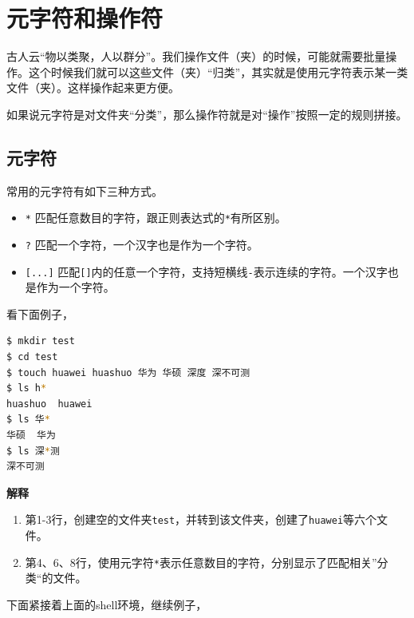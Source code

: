 \documentclass[doctor,openright,twoside]{sjtuthesis}
\providecommand{\tightlist}{%
    \setlength{\itemsep}{0pt}\setlength{\parskip}{0pt}}
\newcommand{\passthrough}[1]{#1}
\theoremstyle{plain}
\theoremstyle{definition}
\theoremstyle{remark}
\theoremstyle{ocrenumbox}
\theoremstyle{plain}
\newcommand\cqh{“}
\newcommand\cqt{”}
\begin{document}
\section{元字符和操作符}

古人云\cqh 物以类聚，人以群分\cqt 。我们操作文件（夹）的时候，可能就需要批量操作。这个时候我们就可以这些文件（夹）\cqh 归类\cqt ，其实就是使用元字符表示某一类文件（夹）。这样操作起来更方便。

如果说元字符是对文件夹\cqh 分类\cqt ，那么操作符就是对\cqh 操作\cqt 按照一定的规则拼接。

\hypertarget{filesystem:metachar}{%
\subsection{元字符}\label{filesystem:metachar}}

常用的元字符有如下三种方式。

\begin{itemize}
\tightlist
\item
  \passthrough{\lstinline!*!}
  匹配任意数目的字符，跟正则表达式的\passthrough{\lstinline!*!}有所区别。
\item
  \passthrough{\lstinline!?!} 匹配一个字符，一个汉字也是作为一个字符。
\item
  \passthrough{\lstinline![...]!}
  匹配\passthrough{\lstinline![]!}内的任意一个字符，支持短横线\passthrough{\lstinline!-!}表示连续的字符。一个汉字也是作为一个字符。
\end{itemize}

看下面例子，

\begin{lstlisting}[language=bash]
$ mkdir test
$ cd test
$ touch huawei huashuo 华为 华硕 深度 深不可测
$ ls h*
huashuo  huawei
$ ls 华*
华硕  华为
$ ls 深*测
深不可测
\end{lstlisting}

\textbf{解释}

\begin{enumerate}
\def\labelenumi{\arabic{enumi}.}
\tightlist
\item
  第1-3行，创建空的文件夹\passthrough{\lstinline!test!}，并转到该文件夹，创建了\passthrough{\lstinline!huawei!}等六个文件。
\item
  第4、6、8行，使用元字符\passthrough{\lstinline!*!}表示任意数目的字符，分别显示了匹配相关''分类``的文件。
\end{enumerate}

下面紧接着上面的shell环境，继续例子，
\end{document}
